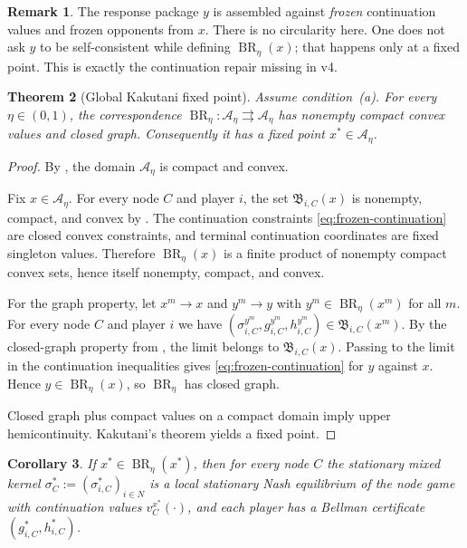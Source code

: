 \documentclass[12pt]{article}
\newtheorem{theorem}{Theorem}[section]
\newtheorem{corollary}[theorem]{Corollary}
\theoremstyle{definition}
\newtheorem{remark}[theorem]{Remark}
\newcommand{\1}{\mathbf{1}}
\newcommand{\cA}{\mathcal{A}}
\DeclareMathOperator{\BR}{BR}
\begin{document}
\begin{remark}
The response package $y$ is assembled against \emph{frozen} continuation values and
frozen opponents from $x$.  There is no circularity here.  One does not ask $y$ to
be self-consistent while defining $\BR_\eta(x)$; that happens only at a fixed
point.  This is exactly the continuation repair missing in v4.
\end{remark}

\begin{theorem}[Global Kakutani fixed point]
\label{thm:kakutani-global}
Assume condition~\textnormal{(a)}.  For every $\eta\in(0,1)$, the correspondence
$\BR_\eta:\cA_\eta\rightrightarrows\cA_\eta$ has nonempty compact convex values and
closed graph.  Consequently it has a fixed point $x^*\in\cA_\eta$.
\end{theorem}

\begin{proof}
By , the domain $\cA_\eta$ is compact and convex.

Fix $x\in\cA_\eta$.  For every node $C$ and player $i$, the set
$\mathfrak B_{i,C}(x)$ is nonempty, compact, and convex by
.  The continuation constraints
\eqref{eq:frozen-continuation} are closed convex constraints, and terminal
continuation coordinates are fixed singleton values.  Therefore $\BR_\eta(x)$ is a
finite product of nonempty compact convex sets, hence itself nonempty, compact, and
convex.

For the graph property, let $x^m\to x$ and $y^m\to y$ with
$y^m\in\BR_\eta(x^m)$ for all $m$.  For every node $C$ and player $i$ we have
$(\sigma_{i,C}^{y^m},g_{i,C}^{y^m},h_{i,C}^{y^m})\in\mathfrak B_{i,C}(x^m)$.  By
the closed-graph property from , the limit belongs to
$\mathfrak B_{i,C}(x)$.  Passing to the limit in the continuation inequalities gives
\eqref{eq:frozen-continuation} for $y$ against $x$.  Hence $y\in\BR_\eta(x)$, so
$\BR_\eta$ has closed graph.

Closed graph plus compact values on a compact domain imply upper
hemicontinuity.  Kakutani's theorem \cite{Kakutani1941} yields a fixed point.
\end{proof}

\begin{corollary}
\label{cor:local-nash-at-fixed-point}
If $x^*\in\BR_\eta(x^*)$, then for every node $C$ the stationary mixed kernel
$\sigma_C^*:=(\sigma_{i,C}^*)_{i\in N}$ is a local stationary Nash equilibrium of
the node game with continuation values $v_C^{x^*}(\cdot)$, and each player has a
Bellman certificate $(g_{i,C}^*,h_{i,C}^*)$.
\end{corollary}
\end{document}
